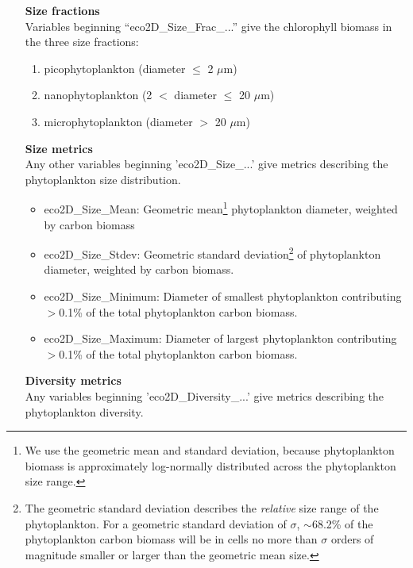 \documentclass[11pt,fleqn]{book} %
\begin{document}
\vspace{2mm}
\begin{itemize}[noitemsep]

\item[\textbf{Size fractions}] \
\\Variables beginning ``\textsf{\footnotesize eco2D\_Size\_Frac\_...}'' give the chlorophyll biomass in the three size fractions:
\begin{enumerate}[noitemsep]
\item picophytoplankton (diameter $\le$ 2 $\mu$m)
\item nanophytoplankton (2 $<$ diameter $\le$ 20 $\mu$m)
\item microphytoplankton (diameter $>$ 20 $\mu$m)
\end{enumerate}

\item[\textbf{Size metrics}] \
\\Any other variables beginning '\textsf{\footnotesize eco2D\_Size\_...}' give metrics describing the {phytoplankton} size distribution.

\begin{itemize}[noitemsep]
\item \textsf{\footnotesize eco2D\_Size\_Mean}: Geometric mean\footnote{ We use the geometric mean and standard deviation, because phytoplankton biomass is approximately log-normally distributed across the phytoplankton size range.} phytoplankton diameter, weighted by carbon biomass
\item \textsf{\footnotesize eco2D\_Size\_Stdev}: Geometric standard deviation\footnote{ The geometric standard deviation describes the \textit{relative} size range of the phytoplankton. For a geometric standard deviation of $\sigma$, $\sim$68.2\% of the phytoplankton carbon biomass will be in cells no more than $\sigma$ orders of magnitude smaller or larger than the geometric mean size.} of phytoplankton diameter, weighted by carbon biomass.
\item \textsf{\footnotesize eco2D\_Size\_Minimum}: Diameter of smallest phytoplankton contributing $>$0.1\% of the total phytoplankton carbon biomass.
\item \textsf{\footnotesize eco2D\_Size\_Maximum}: Diameter of largest phytoplankton contributing $>$0.1\% of the total phytoplankton carbon biomass.
\end{itemize}

\item[\textbf{Diversity metrics}] \
\\Any variables beginning '\textsf{\footnotesize eco2D\_Diversity\_...}' give metrics describing the {phytoplankton} diversity.


\end{itemize}
\end{document}
